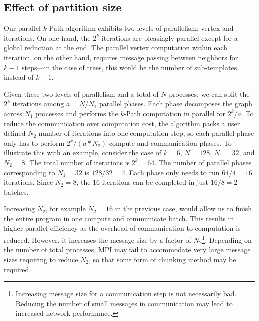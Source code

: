

\subsection{Effect of partition size}
\label{sec:perf-part-size}
Our parallel $k$-Path algorithm exhibits two levels of parallelism: vertex and iterations. On one hand, the $2^k$ iterations are pleasingly parallel except for a global reduction at the end. The parallel vertex computation within each iteration, on the other hand, requires message passing between neighbors for $k-1$ steps---in the case of trees, this would be the number of sub-templates instead of $k-1$. 


Given these two levels of parallelism and a total of $N$ processes, we can split the $2^k$ iterations among $a=N/N_1$  parallel phases. Each phase decomposes the graph across $N_1$ processes and performs the $k$-Path computation in parallel for $2^k/a$. To reduce the communication over computation cost, the algorithm packs a user defined $N_2$ number of iterations into one computation step, so each parallel phase only has to perform $ 2^k/(a*N_2)$ compute and communication phases. 
To illustrate this with an example, consider the case of $k=6$, $N=128$, $N_1=32$, and $N_2=8$. The total number of iterations is $2^k = 64$. The number of parallel phases corresponding to $N_1=32$ is $128/32 = 4$. Each phase only needs to run $64/4 = 16$ iterations. Since $N_2=8$, the $16$ iterations can be completed in just $16/8 = 2$ batches.

Increasing $N_2$, for example $N_2=16$ in the previous case, would allow us to finish the entire program in one compute and communicate batch. This results in higher parallel efficiency as the overhead of communication to computation is reduced. However, it increases the message size by a factor of $N_2$\footnote{Increasing message size for a communication step is not necessarily bad. Reducing the number of small messages in communication may lead to increased network performance\cite{smallmessagecoalasce}.}. Depending on the number of total processes, MPI may fail to accommodate very large message sizes requiring to reduce $N_2$, so that some form of chunking method may be required. 

